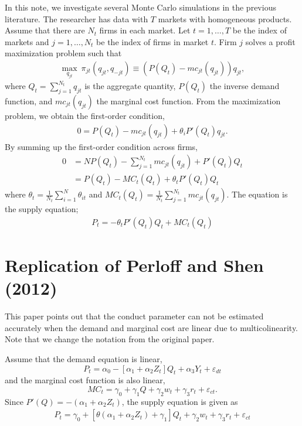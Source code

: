 \documentclass[11pt, a4paper]{article}
\numberwithin{figure}{section}
\theoremstyle{definition}
\newcommand{\0}{\mathbf{0}}
\begin{document}
In this note, we investigate several Monte Carlo simulations in the previous literature.
The researcher has data with $T$ markets with homogeneous products.
Assume that there are $N_t$ firms in each market.
Let $t = 1,\ldots, T$ be the index of markets and $j = 1, \ldots, N_t$ be the index of firms in market $t$.
Firm $j$ solves a profit maximization problem such that
\begin{align*}
    \max_{q_{jt}} \ \pi_{jt}(q_{jt}, q_{-jt}) \equiv (P(Q_t) - mc_{jt}(q_{jt}))q_{jt},
\end{align*}
where $Q_t = \sum_{j = 1}^{N_t} q_{jt}$ is the aggregate quantity, $P(Q_t)$ the inverse demand function, and $mc_{jt}(q_{jt})$ the marginal cost function.
From the maximization problem, we obtain the first-order condition,
\begin{align*}
    0 = P(Q_{t}) - mc_{jt}(q_{jt}) + \theta_i P'(Q_{t})q_{jt}.
\end{align*}
By summing up the first-order condition across firms, 
\begin{align*}
    0 &= NP(Q_t) - \sum_{j = 1}^{N_t} mc_{jt}(q_{jt}) + P'(Q_t)Q_{t}\\
    & =  P(Q_t) - MC_t(Q_t) + \theta_t P'(Q_t)Q_{t}
\end{align*}
where $\theta_t = \frac{1}{N_t}\sum_{i = 1}^N\theta_{it}$ and $MC_t(Q_t) = \frac{1}{N_{t}}\sum_{j = 1}^{N_t} mc_{jt}(q_{jt})$.
The equation is the supply equation;
\begin{align*}
    P_t = - \theta_t P'(Q_{t})Q_t + MC_t(Q_t)
\end{align*}


\section{Replication of Perloff and Shen (2012)}
This paper points out that the conduct parameter can not be estimated accurately when the demand and marginal cost are linear due to multicolinearity. Note that we change the notation from the original paper.

Assume that the demand equation is linear,
\[P_t = \alpha_0 - [\alpha_1 + \alpha_2Z_t] Q_t + \alpha_3 Y_t + \varepsilon_{dt}\]
and the marginal cost function is also linear, 
\[MC_t = \gamma_0  + \gamma_1 Q + \gamma_2 w_t + \gamma_3 r_t + \varepsilon_{ct}.\]
Since $P'(Q) = -(\alpha_1 + \alpha_2Z_t)$, the supply equation is given as
\begin{align*}
    P_t = \gamma_0 + [\theta(\alpha_1 + \alpha_2Z_t)+ \gamma_1] Q_t   + \gamma_2 w_t + \gamma_3 r_t + \varepsilon_{ct}
\end{align*}
\end{document}
